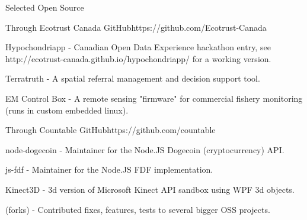 \documentclass{resume} %
\begin{document}

\begin{rSection}{Selected Open Source}

\begin{rSubsection}{Through Ecotrust Canada GitHub}{https://github.com/Ecotrust-Canada}{}{}
\item Hypochondriapp - Canadian Open Data Experience hackathon entry, see \newline
http://ecotrust-canada.github.io/hypochondriapp/ for a working version.
\item Terratruth - A spatial referral management and decision support tool.
\item EM Control Box - A remote sensing "firmware" for commercial fishery monitoring (runs in custom embedded linux).
\end{rSubsection}

\begin{rSubsection}{Through Countable GitHub}{https://github.com/countable}{}{}
\item node-dogecoin - Maintainer for the Node.JS Dogecoin (cryptocurrency) API.
\item js-fdf - Maintainer for the Node.JS FDF implementation.
\item Kinect3D - 3d version of Microsoft Kinect API sandbox using WPF 3d objects.
\item (forks) - Contributed fixes, features, tests to several bigger OSS projects.
\end{rSubsection}


\end{rSection}



\end{document}
